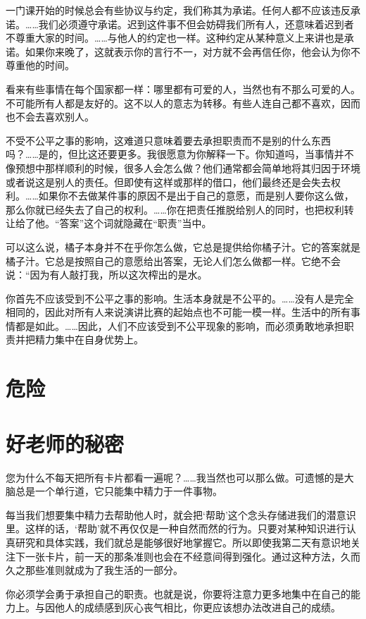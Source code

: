 \documentclass{ctexart}
\begin{document}
一门课开始的时候总会有些协议与约定，我们称其为承诺。任何人都不应该违反承诺。……我们必须遵守承诺。迟到这件事不但会妨碍我们所有人，还意味着迟到者不尊重大家的时间。……与他人的约定也一样。这种约定从某种意义上来讲也是承诺。如果你来晚了，这就表示你的言行不一，对方就不会再信任你，他会认为你不尊重他的时间。

看来有些事情在每个国家都一样：哪里都有可爱的人，当然也有不那么可爱的人。不可能所有人都是友好的。这不以人的意志为转移。有些人连自己都不喜欢，因而也不会去喜欢别人。

不受不公平之事的影响，这难道只意味着要去承担职责而不是别的什么东西吗？……是的，但比这还要更多。我很愿意为你解释一下。你知道吗，当事情并不像预想中那样顺利的时候，很多人会怎么做？他们通常都会简单地将其归因于环境或者说这是别人的责任。但即使有这样或那样的借口，他们最终还是会失去权利。……如果你不去做某件事的原因不是出于自己的意愿，而是别人要你这么做，那么你就已经失去了自己的权利。……你在把责任推脱给别人的同时，也把权利转让给了他。“答案”这个词就隐藏在“职责”当中。

可以这么说，橘子本身并不在乎你怎么做，它总是提供给你橘子汁。它的答案就是橘子汁。它总是按照自己的意愿给出答案，无论人们怎么做都一样。它绝不会说：“因为有人敲打我，所以这次榨出的是水。

你首先不应该受到不公平之事的影响。生活本身就是不公平的。……没有人是完全相同的，因此对所有人来说演讲比赛的起始点也不可能一模一样。生活中的所有事情都是如此。……因此，人们不应该受到不公平现象的影响，而必须勇敢地承担职责并把精力集中在自身优势上。

\section{危险}

\section{好老师的秘密}

您为什么不每天把所有卡片都看一遍呢？……我当然也可以那么做。可遗憾的是大脑总是一个单行道，它只能集中精力于一件事物。

每当我们想要集中精力去帮助他人时，就会把‘帮助’这个念头存储进我们的潜意识里。这样的话，‘帮助’就不再仅仅是一种自然而然的行为。只要对某种知识进行认真研究和具体实践，我们就总是能够很好地掌握它。所以即使我第二天有意识地关注下一张卡片，前一天的那条准则也会在不经意间得到强化。通过这种方法，久而久之那些准则就成为了我生活的一部分。

你必须学会勇于承担自己的职责。也就是说，你要将注意力更多地集中在自己的能力上。与因他人的成绩感到灰心丧气相比，你更应该想办法改进自己的成绩。
\end{document}
